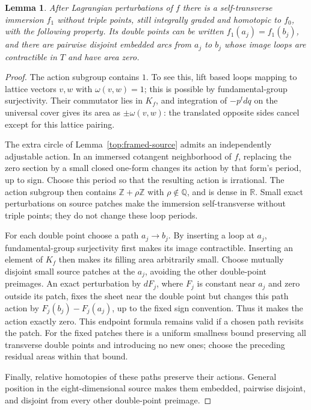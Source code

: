 \documentclass[11pt]{article}
\newtheorem{lemma}[theorem]{Lemma}
\theoremstyle{definition}
\theoremstyle{remark}
\numberwithin{equation}{section}
\begin{document}
\begin{lemma}\label{top:zero-actions}
After Lagrangian perturbations of $f$ there is a self-transverse
immersion $f_1$ without triple points, still integrally graded and
homotopic to $f_0$, with the following property.  Its double points
can be written $f_1(a_j)=f_1(b_j)$, and there are pairwise disjoint
embedded arcs from $a_j$ to $b_j$ whose image loops are contractible
in $T$ and have area zero.
\end{lemma}

\begin{proof}
The action subgroup contains $1$.  To see this, lift based loops
mapping to lattice vectors $v,w$ with $\omega(v,w)=1$; this is
possible by fundamental-group surjectivity.  Their commutator lies
in $K_f$, and integration of $-p^t dq$ on the universal cover gives
its area as $\pm\omega(v,w)$: the translated opposite sides cancel
except for this lattice pairing.

The extra circle of Lemma~\ref{top:framed-source} admits an
independently adjustable action.  In an immersed cotangent
neighborhood of $f$, replacing the zero section by a small closed
one-form changes its action by that form's period, up to sign.
Choose this period so that the resulting action is irrational.
The action subgroup then contains $\mathbb Z+\rho\mathbb Z$ with
$\rho\notin\mathbb Q$, and is dense in $\mathbb R$.  Small exact perturbations
on source patches make the immersion self-transverse without triple
points; they do not change these loop periods.

For each double point choose a path $a_j\to b_j$.  By inserting a
loop at $a_j$, fundamental-group surjectivity first makes its image
contractible.  Inserting an element of $K_f$ then makes its filling
area arbitrarily small.  Choose mutually disjoint small source
patches at the $a_j$, avoiding the other double-point preimages.
An exact perturbation by $dF_j$, where $F_j$ is constant near $a_j$
and zero outside its patch, fixes the sheet near the double point
but changes this path action by $F_j(b_j)-F_j(a_j)$, up to the
fixed sign convention.  Thus it makes the action exactly zero.
This endpoint formula remains valid if a chosen path revisits the
patch.  For the fixed patches there is a uniform smallness bound
preserving all transverse double points and introducing no new
ones; choose the preceding residual areas within that bound.

Finally, relative homotopies of these paths preserve their actions.
General position in the eight-dimensional source makes them
embedded, pairwise disjoint, and disjoint from every other
double-point preimage.
\end{proof}
\end{document}
